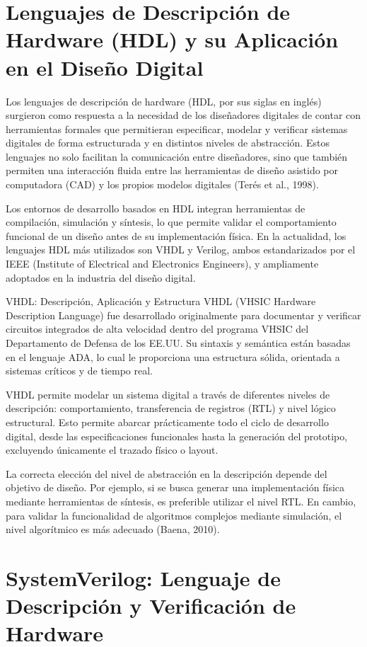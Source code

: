 \section{Lenguajes de Descripción de Hardware (HDL) y su Aplicación en el Diseño Digital}

Los lenguajes de descripción de hardware (HDL, por sus siglas en inglés) surgieron como respuesta a la necesidad de los diseñadores digitales de contar con herramientas formales que permitieran especificar, modelar y verificar sistemas digitales de forma estructurada y en distintos niveles de abstracción. Estos lenguajes no solo facilitan la comunicación entre diseñadores, sino que también permiten una interacción fluida entre las herramientas de diseño asistido por computadora (CAD) y los propios modelos digitales (Terés et al., 1998).

Los entornos de desarrollo basados en HDL integran herramientas de compilación, simulación y síntesis, lo que permite validar el comportamiento funcional de un diseño antes de su implementación física. En la actualidad, los lenguajes HDL más utilizados son VHDL y Verilog, ambos estandarizados por el IEEE (Institute of Electrical and Electronics Engineers), y ampliamente adoptados en la industria del diseño digital.

VHDL: Descripción, Aplicación y Estructura
VHDL (VHSIC Hardware Description Language) fue desarrollado originalmente para documentar y verificar circuitos integrados de alta velocidad dentro del programa VHSIC del Departamento de Defensa de los EE.UU. Su sintaxis y semántica están basadas en el lenguaje ADA, lo cual le proporciona una estructura sólida, orientada a sistemas críticos y de tiempo real.

VHDL permite modelar un sistema digital a través de diferentes niveles de descripción: comportamiento, transferencia de registros (RTL) y nivel lógico estructural. Esto permite abarcar prácticamente todo el ciclo de desarrollo digital, desde las especificaciones funcionales hasta la generación del prototipo, excluyendo únicamente el trazado físico o layout.

La correcta elección del nivel de abstracción en la descripción depende del objetivo de diseño. Por ejemplo, si se busca generar una implementación física mediante herramientas de síntesis, es preferible utilizar el nivel RTL. En cambio, para validar la funcionalidad de algoritmos complejos mediante simulación, el nivel algorítmico es más adecuado (Baena, 2010).


\section{SystemVerilog: Lenguaje de Descripción y Verificación de Hardware }

